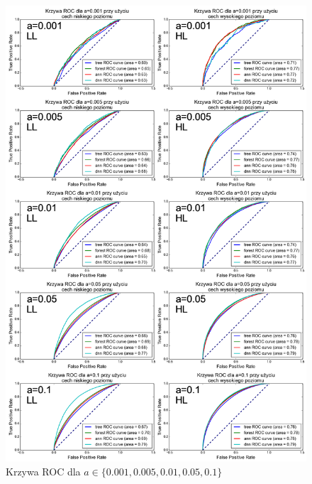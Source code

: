 \begin{figure}[ht!]
\centering
\includegraphics[scale=0.425]{res/allnew1.png}
\caption[Caption for LOF]{Krzywa ROC dla $a\in\{0.001, 0.005, 0.01, 0.05, 0.1\}$\label{higgsall1}}
\end{figure} 

